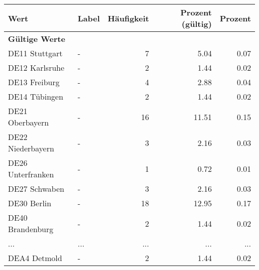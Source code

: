      \begin{longtable}{Xlrrr}
     \toprule
     \textbf{Wert} & \textbf{Label} & \textbf{Häufigkeit} & \textbf{Prozent (gültig)} & \textbf{Prozent} \\
     \endhead
     \midrule
     \multicolumn{5}{l}{\textbf{Gültige Werte}}\\
        \multicolumn{1}{X}{DE11 Stuttgart} & - & \num{7} & \num[round-mode=places,round-precision=2]{5.04} & \num[round-mode=places,round-precision=2]{0.07} \\
        \multicolumn{1}{X}{DE12 Karlsruhe} & - & \num{2} & \num[round-mode=places,round-precision=2]{1.44} & \num[round-mode=places,round-precision=2]{0.02} \\
        \multicolumn{1}{X}{DE13 Freiburg} & - & \num{4} & \num[round-mode=places,round-precision=2]{2.88} & \num[round-mode=places,round-precision=2]{0.04} \\
        \multicolumn{1}{X}{DE14 Tübingen} & - & \num{2} & \num[round-mode=places,round-precision=2]{1.44} & \num[round-mode=places,round-precision=2]{0.02} \\
        \multicolumn{1}{X}{DE21 Oberbayern} & - & \num{16} & \num[round-mode=places,round-precision=2]{11.51} & \num[round-mode=places,round-precision=2]{0.15} \\
        \multicolumn{1}{X}{DE22 Niederbayern} & - & \num{3} & \num[round-mode=places,round-precision=2]{2.16} & \num[round-mode=places,round-precision=2]{0.03} \\
        \multicolumn{1}{X}{DE26 Unterfranken} & - & \num{1} & \num[round-mode=places,round-precision=2]{0.72} & \num[round-mode=places,round-precision=2]{0.01} \\
        \multicolumn{1}{X}{DE27 Schwaben} & - & \num{3} & \num[round-mode=places,round-precision=2]{2.16} & \num[round-mode=places,round-precision=2]{0.03} \\
        \multicolumn{1}{X}{DE30 Berlin} & - & \num{18} & \num[round-mode=places,round-precision=2]{12.95} & \num[round-mode=places,round-precision=2]{0.17} \\
        \multicolumn{1}{X}{DE40 Brandenburg} & - & \num{2} & \num[round-mode=places,round-precision=2]{1.44} & \num[round-mode=places,round-precision=2]{0.02} \\
       ... & ... & ... & ... & ... \\
        \multicolumn{1}{X}{DEA4 Detmold} & - & \num{2} & \num[round-mode=places,round-precision=2]{1.44} & \num[round-mode=places,round-precision=2]{0.02} \\

\end{longtable}
